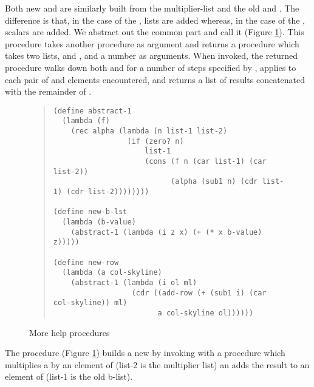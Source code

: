 Both new  and  are similarly built from the
multiplier-list and the old  and .  The
difference is that, in the case of the , lists are added
whereas, in the case of the , scalars are added.  We abstract
out the common part and call it 
(Figure \ref{fig:abs}).  This procedure takes
another procedure  as argument and returns a procedure
which takes two lists,  and , and a number 
as arguments.  When invoked, the returned procedure walks down both
 and  for a number of steps specified by ,
applies  to each pair of  and  elements
encountered, and returns a list of results concatenated with the remainder
of .

\begin{figure}
\begin{frameit}
\begin{quote}
\begin{verbatim}
(define abstract-1
  (lambda (f)
    (rec alpha (lambda (n list-1 list-2)
                 (if (zero? n)
                     list-1
                     (cons (f n (car list-1) (car list-2))
                           (alpha (sub1 n) (cdr list-1) (cdr list-2))))))))

(define new-b-lst
  (lambda (b-value)
    (abstract-1 (lambda (i z x) (+ (* x b-value) z)))))

(define new-row
  (lambda (a col-skyline)
    (abstract-1 (lambda (i ol ml)
                  (cdr ((add-row (+ (sub1 i) (car col-skyline)) ml)
                        a col-skyline ol))))))
\end{verbatim}
\end{quote}
\caption{More help procedures}
\label{fig:abs}
\end{frameit}
\end{figure}

The procedure  (Figure \ref{fig:abs}) builds a new
 by
invoking  with  a procedure which multiplies a
 by an element of  (list-2 is the multiplier list) an
adds the result to an element of  (list-1 is the old b-list).

